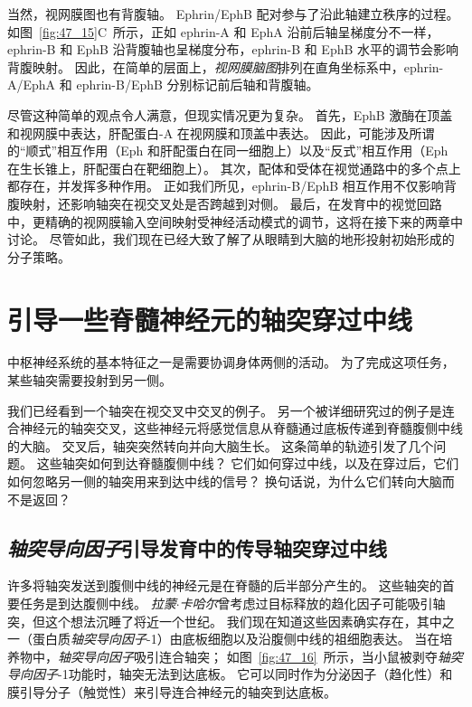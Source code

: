 当然，视网膜图也有背腹轴。
Ephrin/EphB 配对参与了沿此轴建立秩序的过程。
如图~\ref{fig:47_15}C~所示，正如 ephrin-A 和 EphA 沿前后轴呈梯度分不一样，ephrin-B 和 EphB 沿背腹轴也呈梯度分布，ephrin-B 和 EphB 水平的调节会影响背腹映射。
因此，在简单的层面上，\textit{视网膜脑图}排列在直角坐标系中，ephrin-A/EphA 和 ephrin-B/EphB 分别标记前后轴和背腹轴。


尽管这种简单的观点令人满意，但现实情况更为复杂。
首先，EphB 激酶在顶盖和视网膜中表达，肝配蛋白-A 在视网膜和顶盖中表达。
因此，可能涉及所谓的“顺式”相互作用（Eph 和肝配蛋白在同一细胞上）以及“反式”相互作用（Eph 在生长锥上，肝配蛋白在靶细胞上）。
其次，配体和受体在视觉通路中的多个点上都存在，并发挥多种作用。
正如我们所见，ephrin-B/EphB 相互作用不仅影响背腹映射，还影响轴突在视交叉处是否跨越到对侧。
最后，在发育中的视觉回路中，更精确的视网膜输入空间映射受神经活动模式的调节，这将在接下来的两章中讨论。
尽管如此，我们现在已经大致了解了从眼睛到大脑的地形投射初始形成的分子策略。



\section{引导一些脊髓神经元的轴突穿过中线}

中枢神经系统的基本特征之一是需要协调身体两侧的活动。
为了完成这项任务，某些轴突需要投射到另一侧。


我们已经看到一个轴突在视交叉中交叉的例子。
另一个被详细研究过的例子是连合神经元的轴突交叉，这些神经元将感觉信息从脊髓通过底板传递到脊髓腹侧中线的大脑。
交叉后，轴突突然转向并向大脑生长。
这条简单的轨迹引发了几个问题。
这些轴突如何到达脊髓腹侧中线？
它们如何穿过中线，以及在穿过后，它们如何忽略另一侧的轴突用来到达中线的信号？
换句话说，为什么它们转向大脑而不是返回？



\subsection{\textit{轴突导向因子}引导发育中的传导轴突穿过中线}

许多将轴突发送到腹侧中线的神经元是在脊髓的后半部分产生的。
这些轴突的首要任务是到达腹侧中线。
\textit{拉蒙$\cdot$卡哈尔}曾考虑过目标释放的趋化因子可能吸引轴突，但这个想法沉睡了将近一个世纪。
我们现在知道这些因素确实存在，其中之一（蛋白质\textit{轴突导向因子}-1）由底板细胞以及沿腹侧中线的祖细胞表达。
当在培养物中，\textit{轴突导向因子}吸引连合轴突；
如图~\ref{fig:47_16}~所示，当小鼠被剥夺\textit{轴突导向因子}-1功能时，轴突无法到达底板。
它可以同时作为分泌因子（趋化性）和膜引导分子（触觉性）来引导连合神经元的轴突到达底板。


